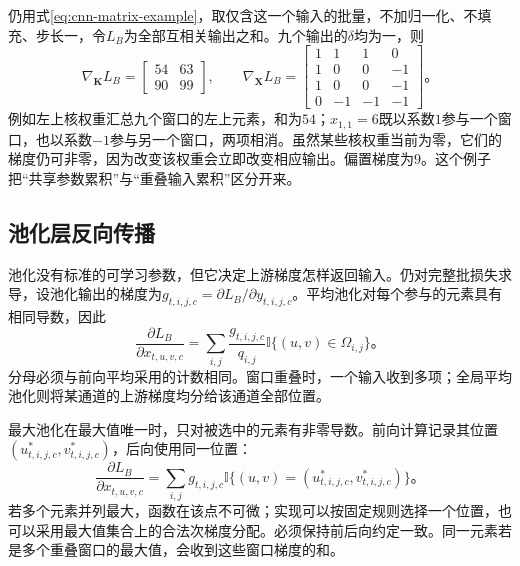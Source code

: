 仍用式\eqref{eq:cnn-matrix-example}，取仅含这一个输入的批量，不加归一化、不填充、步长一，令$L_B$为全部互相关输出之和。九个输出的$\delta$均为一，则
\begin{equation}
  \nabla_{\bm K}L_B=
    \begin{bmatrix}54&63\\90&99\end{bmatrix},\qquad
  \nabla_{\bm X}L_B=
    \begin{bmatrix}
      1&1&1&0\\1&0&0&-1\\1&0&0&-1\\0&-1&-1&-1
    \end{bmatrix}\text{。}
  \label{eq:cnn-gradient-example}
\end{equation}
例如左上核权重汇总九个窗口的左上元素，和为$54$；$x_{1,1}=6$既以系数$1$参与一个窗口，也以系数$-1$参与另一个窗口，两项相消。虽然某些核权重当前为零，它们的梯度仍可非零，因为改变该权重会立即改变相应输出。偏置梯度为$9$。这个例子把“共享参数累积”与“重叠输入累积”区分开来。

\subsection{池化层反向传播}
\label{sec:cnn-pooling-backpropagation}

池化没有标准的可学习参数，但它决定上游梯度怎样返回输入。仍对完整批损失求导，设池化输出的梯度为$g_{t,i,j,c}=\partial L_B/\partial y_{t,i,j,c}$。平均池化对每个参与的元素具有相同导数，因此
\begin{equation}
  \frac{\partial L_B}{\partial x_{t,u,v,c}}
  =\sum_{i,j}\frac{g_{t,i,j,c}}{q_{i,j}}
                  \mathbb I\{(u,v)\in\Omega_{i,j}\}\text{。}
  \label{eq:cnn-average-pooling-gradient}
\end{equation}
分母必须与前向平均采用的计数相同。窗口重叠时，一个输入收到多项；全局平均池化则将某通道的上游梯度均分给该通道全部位置。

最大池化在最大值唯一时，只对被选中的元素有非零导数。前向计算记录其位置$(u^*_{t,i,j,c},v^*_{t,i,j,c})$，后向使用同一位置：
\begin{equation}
  \frac{\partial L_B}{\partial x_{t,u,v,c}}
  =\sum_{i,j}g_{t,i,j,c}
       \mathbb I\{(u,v)=(u^*_{t,i,j,c},v^*_{t,i,j,c})\}\text{。}
  \label{eq:cnn-max-pooling-gradient}
\end{equation}
若多个元素并列最大，函数在该点不可微；实现可以按固定规则选择一个位置，也可以采用最大值集合上的合法次梯度分配。必须保持前后向约定一致。同一元素若是多个重叠窗口的最大值，会收到这些窗口梯度的和。

